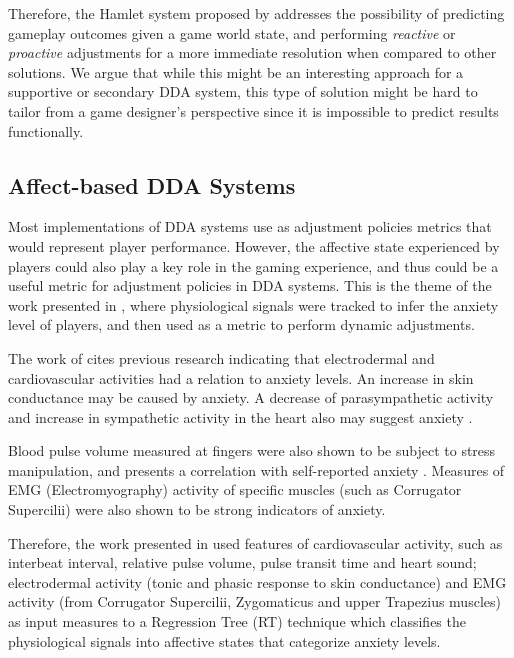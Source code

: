 Therefore, the Hamlet system proposed by \citet{article_casefordynamicdifficulty} addresses the possibility of predicting gameplay outcomes given a game world state, and performing \emph{reactive} or \emph{proactive} adjustments for a more immediate resolution when compared to other solutions. We argue that while this might be an interesting approach for a supportive or secondary DDA system, this type of solution might be hard to tailor from a game designer's perspective since it is impossible to predict results functionally.


\subsection{Affect-based DDA Systems}

Most implementations of DDA systems use as adjustment policies metrics that would represent player performance. However, the affective state experienced by players could also play a key role in the gaming experience, and thus could be a useful metric for adjustment policies in DDA systems. This is the theme of the work presented in \cite{article_affectivedda}, where physiological signals were tracked to infer the anxiety level of players, and then used as a metric to perform dynamic adjustments.

The work of \citet{article_affectivedda} cites previous research indicating that electrodermal and cardiovascular activities had a relation to anxiety levels. An increase in skin conductance may be caused by anxiety. A decrease of parasympathetic activity and increase in sympathetic activity in the heart also may suggest anxiety \cite{article_affectivedda}.

Blood pulse volume measured at fingers were also shown to be subject to stress manipulation, and presents a correlation with self-reported anxiety \cite{article_affectivedda}. Measures of EMG (Electromyography) activity of specific muscles (such as Corrugator Supercilii) were also shown to be strong indicators of anxiety.

Therefore, the work presented in \cite{article_affectivedda} used features of cardiovascular activity, such as interbeat interval, relative pulse volume, pulse transit time and heart sound; electrodermal activity (tonic and phasic response to skin conductance) and EMG activity (from Corrugator Supercilii, Zygomaticus and upper Trapezius muscles) as input measures to a Regression Tree (RT) technique which classifies the physiological signals into affective states that categorize anxiety levels.

